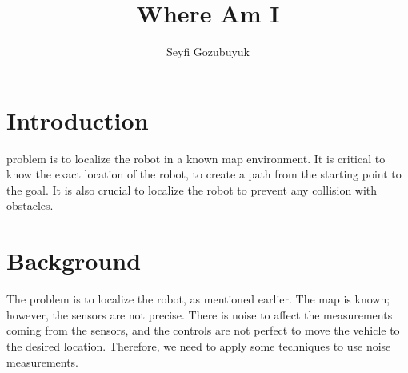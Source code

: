 \documentclass[10pt,journal,compsoc]{IEEEtran}
\begin{document}
\title{Where Am I}

\author{Seyfi Gozubuyuk}

%
{}


\maketitle
\IEEEdisplaynontitleabstractindextext
\IEEEpeerreviewmaketitle
\section{Introduction}
\label{sec:introduction}

 problem is to localize the robot in a known map environment. It is critical to know the exact location of the robot, to create a path from the starting point to the goal. It is also crucial to localize the robot to prevent any collision with obstacles.


\section{Background}
The problem is to localize the robot, as mentioned earlier. The map is known; however, the sensors are not precise. There is noise to affect the measurements coming from the sensors, and the controls are not perfect to move the vehicle to the desired location. Therefore, we need to apply some techniques to use noise measurements.
\end{document}

